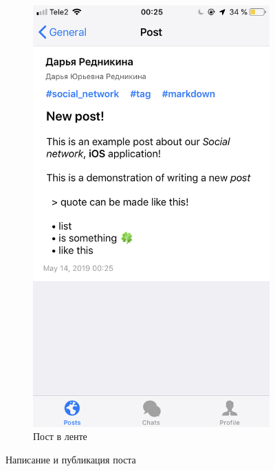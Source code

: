 \documentclass[a4paper,12pt]{article}
\begin{document}
\begin{figure}[h!]
\begin{subfigure}[b]{0.3\linewidth}
			\includegraphics[width=\linewidth]{../includes/ro/display.png}
			\caption{\label{pic: display}Пост в ленте}
		\end{subfigure}
		\caption{\label{pic: writenewpost}Написание и публикация поста}
	\end{figure}
 	\clearpage
\end{document}
